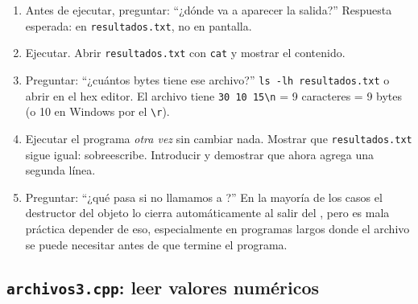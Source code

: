 \documentclass[12pt, oneside]{article}
\begin{document}
\begin{notaprofesor}
  \begin{enumerate}
    \item Antes de ejecutar, preguntar: ``¿dónde va a aparecer la salida?''
          Respuesta esperada: en \texttt{resultados.txt}, no en pantalla.
    \item Ejecutar.  Abrir \texttt{resultados.txt} con \texttt{cat} y
          mostrar el contenido.
    \item Preguntar: ``¿cuántos bytes tiene ese archivo?''
          \texttt{ls -lh resultados.txt} o abrir en el hex editor.
          El archivo tiene \texttt{30 10 15\textbackslash n} = 9 caracteres = 9 bytes
          (o 10 en Windows por el \texttt{\textbackslash r}).
    \item Ejecutar el programa \textit{otra vez} sin cambiar nada.
          Mostrar que \texttt{resultados.txt} sigue igual: 
          sobreescribe.  Introducir  y demostrar que
          ahora agrega una segunda línea.
    \item Preguntar: ``¿qué pasa si no llamamos a ?''
          En la mayoría de los casos el destructor del objeto lo cierra
          automáticamente al salir del , pero es mala práctica
          depender de eso, especialmente en programas largos donde el
          archivo se puede necesitar antes de que termine el programa.
  \end{enumerate}
\end{notaprofesor}

\subsection{\texttt{archivos3.cpp}: leer valores numéricos}
\end{document}
